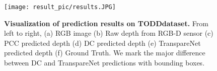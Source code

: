 \documentclass{article}
\newcommand{\algoName}{TranspareNet\xspace}
\newcommand{\dataName}{TODD}
\begin{document}
\begin{figure}[!t]

\centering
\texttt{[image: result\_pic/results.JPG]}

\caption{\textbf{Visualization of prediction results on \dataName dataset.} From left to right, (a) RGB image (b) Raw depth from RGB-D sensor (c) PCC predicted depth (d) DC predicted depth (e) \algoName predicted depth (f) Ground Truth. We mark the major difference between DC and \algoName predictions with bounding boxes.}
\label{fig:result_compare}
\end{figure}
\end{document}
